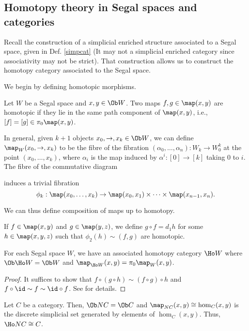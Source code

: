 \subsection{Homotopy theory in Segal spaces and categories}
Recall the construction of a simplicial enriched structure associated to a Segal space, given in Def. \ref{simpcat} (It may not a simplicial enriched category since associativity may not be strict). That construction allows us to construct the homotopy category associated to the Segal space.

We begin by defining homotopic morphisms.
\begin{defin}
Let $W$ be a Segal space and $x,y\in\Ob W$. Two maps $f,g\in\map(x,y)$ are homotopic if they lie in the same path component of $\map(x,y)$, i.e., $[f]=[g]\in\pi_0\map(x,y)$.
\end{defin}

In general, given $k+1$ objects $x_0,\to,x_k\in\Ob W$, we can define $\map_W(x_0,\to,x_k)$ to be the fibre of the fibration $(\alpha_0,\ldots,\alpha_n):W_k\to W_0^k$ at the point $(x_0,\ldots,x_k)$, where $\alpha_i$ is the map induced by $\alpha^i:[0]\to[k]$ taking 0 to $i$. The fibre of the commutative diagram

\centerline{}

induces a trivial fibration
$$\phi_k:\map(x_0,\ldots,x_k)\to\map(x_0,x_1)\times\cdots\times\map(x_{n-1},x_n).$$

We can thus define composition of maps up to homotopy.
\begin{defin}
If $f\in\map(x,y)$ and $g\in\map(y,z)$, we define $g\circ f=d_1h$ for some $h\in\map(x,y,z)$ such that $\phi_2(h)\sim(f,g)$ are homotopic.
\end{defin}

\begin{prop}
For each Segal space $W$, we have an associated homotopy category $\Ho W$ where $\Ob\Ho W=\Ob W$ and $\map_{\Ho W}(x,y)=\pi_0\map_W(x,y)$.
\end{prop}
\begin{proof}
It suffices to show that $f\circ(g\circ h)\sim(f\circ g)\circ h$ and $f\circ\id\sim f\sim\id\circ f$. See \cite[Prop 5.4]{rezk} for details.
\end{proof}

\begin{eg}
Let $C$ be a category. Then, $\Ob NC=\Ob C$ and $\map_{NC}(x,y)\cong\hom_C(x,y)$ is the discrete simplicial set generated by elements of $\hom_C(x,y)$. Thus, $\Ho NC\cong C$.
\end{eg}

